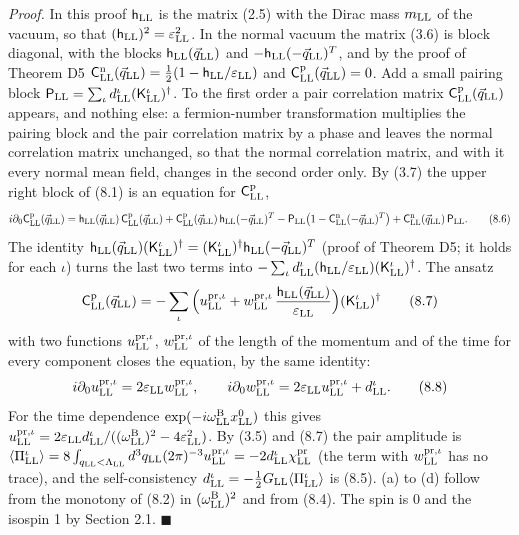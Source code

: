 \documentclass[
  10pt,
]{article}
\begin{document}
\emph{Proof.} In this proof \(\mathsf h_{\rm LL}\) is the matrix (2.5)
with the Dirac mass \(m_{\rm LL}\) of the vacuum, so that
\((\mathsf h_{\rm LL})^2=\varepsilon_{\rm LL}^2\). In the normal vacuum
the matrix (3.6) is block diagonal, with the blocks
\(\mathsf h_{\rm LL}(\vec q_{\rm LL})\) and
\(-\mathsf h_{\rm LL}(-\vec q_{\rm LL})^T\), and by the proof of Theorem
D5
\(\mathsf C^{\rm n}_{\rm LL}(\vec q_{\rm LL})=\tfrac12(1-\mathsf h_{\rm LL}/\varepsilon_{\rm LL})\)
and \(\mathsf C^{\rm p}_{\rm LL}(\vec q_{\rm LL})=0\). Add a small
pairing block
\(\mathsf P_{\rm LL}=\sum_\iota d^\iota_{\rm LL}(\mathsf K^\iota_{\rm LL})^\dagger\).
To the first order a pair correlation matrix
\(\mathsf C^{\rm p}_{\rm LL}(\vec q_{\rm LL})\) appears, and nothing
else: a fermion-number transformation multiplies the pairing block and
the pair correlation matrix by a phase and leaves the normal correlation
matrix unchanged, so that the normal correlation matrix, and with it
every normal mean field, changes in the second order only. By (3.7) the
upper right block of (8.1) is an equation for
\(\mathsf C^{\rm p}_{\rm LL}\),
\[i\partial_0\mathsf C^{\rm p}_{\rm LL}(\vec q_{\rm LL})=\mathsf h_{\rm LL}(\vec q_{\rm LL})\,\mathsf C^{\rm p}_{\rm LL}(\vec q_{\rm LL})+\mathsf C^{\rm p}_{\rm LL}(\vec q_{\rm LL})\,\mathsf h_{\rm LL}(-\vec q_{\rm LL})^T
-\mathsf P_{\rm LL}\big(1-\mathsf C^{\rm n}_{\rm LL}(-\vec q_{\rm LL})^T\big)+\mathsf C^{\rm n}_{\rm LL}(\vec q_{\rm LL})\,\mathsf P_{\rm LL}.\tag{8.6}\]
The identity
\(\mathsf h_{\rm LL}(\vec q_{\rm LL})(\mathsf K^\iota_{\rm LL})^\dagger=(\mathsf K^\iota_{\rm LL})^\dagger\mathsf h_{\rm LL}(-\vec q_{\rm LL})^T\)
(proof of Theorem D5; it holds for each \(\iota\)) turns the last two
terms into
\(-\sum_\iota d^\iota_{\rm LL}(\mathsf h_{\rm LL}/\varepsilon_{\rm LL})(\mathsf K^\iota_{\rm LL})^\dagger\).
The ansatz
\[\mathsf C^{\rm p}_{\rm LL}(\vec q_{\rm LL})=-\sum_\iota\Big(u^{{\rm pr},\iota}_{\rm LL}+w^{{\rm pr},\iota}_{\rm LL}\,\frac{\mathsf h_{\rm LL}(\vec q_{\rm LL})}{\varepsilon_{\rm LL}}\Big)(\mathsf K^\iota_{\rm LL})^\dagger\tag{8.7}\]
with two functions \(u^{{\rm pr},\iota}_{\rm LL}\),
\(w^{{\rm pr},\iota}_{\rm LL}\) of the length of the momentum and of the
time for every component closes the equation, by the same identity:
\[i\partial_0u^{{\rm pr},\iota}_{\rm LL}=2\varepsilon_{\rm LL}w^{{\rm pr},\iota}_{\rm LL},\qquad
i\partial_0w^{{\rm pr},\iota}_{\rm LL}=2\varepsilon_{\rm LL}u^{{\rm pr},\iota}_{\rm LL}+d^\iota_{\rm LL}.\tag{8.8}\]
For the time dependence \(\exp(-i\omega^{\rm B}_{\rm LL}x^0_{\rm LL})\)
this gives
\(u^{{\rm pr},\iota}_{\rm LL}=2\varepsilon_{\rm LL}d^\iota_{\rm LL}/((\omega^{\rm B}_{\rm LL})^2-4\varepsilon_{\rm LL}^2)\).
By (3.5) and (8.7) the pair amplitude is
\(\langle\Pi^\iota_{\rm LL}\rangle=8\int_{q_{\rm LL}<\Lambda_{\rm LL}}d^3q_{\rm LL}(2\pi)^{-3}u^{{\rm pr},\iota}_{\rm LL}=-2d^\iota_{\rm LL}\chi^{\rm pr}_{\rm LL}\)
(the term with \(w^{{\rm pr},\iota}_{\rm LL}\) has no trace), and the
self-consistency
\(d^\iota_{\rm LL}=-\tfrac12G_{\rm LL}\langle\Pi^\iota_{\rm LL}\rangle\)
is (8.5). (a) to (d) follow from the monotony of (8.2) in
\((\omega^{\rm B}_{\rm LL})^2\) and from (8.4). The spin is 0 and the
isospin 1 by Section 2.1. \(\blacksquare\)
\end{document}
